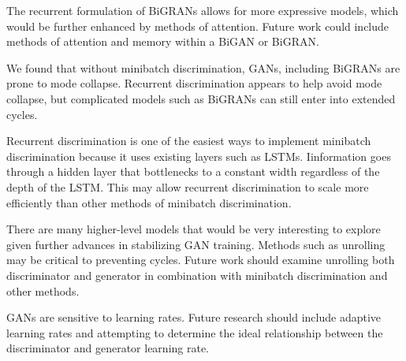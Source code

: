 \documentclass{article}
\begin{document}
The recurrent formulation of BiGRANs allows for more expressive models, which would be further enhanced by methods of attention. Future work could include methods of attention and memory within a BiGAN or BiGRAN.

We found that without minibatch discrimination, GANs, including BiGRANs are prone to mode collapse. Recurrent discrimination appears to help avoid mode collapse, but complicated models such as BiGRANs can still enter into extended cycles.

Recurrent discrimination is one of the easiest ways to implement minibatch discrimination because it uses existing layers such as LSTMs. Iinformation goes through a hidden layer that bottlenecks to a constant width regardless of the depth of the LSTM. This may allow recurrent discrimination to scale more efficiently than other methods of minibatch discrimination.

There are many higher-level models that would be very interesting to explore given further advances in stabilizing GAN training. Methods such as unrolling \cite{DBLP:journals/corr/MetzPPS16} may be critical to preventing cycles. Future work should examine unrolling both discriminator and generator in combination with minibatch discrimination and other methods.

 GANs are sensitive to learning rates. Future research should include adaptive learning rates and attempting to determine the ideal relationship between the discriminator and generator learning rate.
 

\nocite{*}


\end{document}
